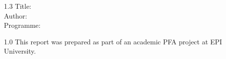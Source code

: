 
\begin{spacing}{1.3}
Title: \thesisTitle \\
Author: \thesisAuthor \\
Programme: \DoctoralProgramme
\end{spacing}


\vspace{\fill}
\begin{spacing}{1.0}
This report was prepared as part of an academic PFA project at EPI University.
\end{spacing}
